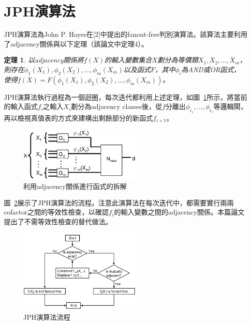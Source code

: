 \documentclass[
  12pt,
  paper=a4,
  ,captions=tableheading
]{scrartcl}
\newtheorem*{thm}{定理}
\begin{document}
\hypertarget{jphux6f14ux7b97ux6cd5}{%
\section{JPH演算法}\label{jphux6f14ux7b97ux6cd5}}

JPH演算法為John P.
Hayes在{[}2{]}中提出的fanout-free判別演算法。該算法主要利用了adjacency關係與以下定理（該論文中定理4）。

\begin{thm}

以adjacency關係將$f(X)$的輸入變數集合$X$劃分為等價類$X_1, X_2, \dots, X_m$，
則存在$\phi_1(X_1), \phi_2(X_2), \dots, \phi_m(X_m)$以及函式$F$，其中$\phi_i$為AND或OR函式，
使得$f(X) = F(\phi_1(X_1), \phi_2(X_2), \dots, \phi_m(X_m))$。

\end{thm}

JPH演算法執行過程為一個迴圈，每次迭代都利用上述定理，如圖~\ref{fig:decomp}所示，將當前的輸入函式\(f_i\)之輸入\(X_i\)劃分為adjacency
classes後，從\(f\)分離出\(\phi_{i_1}, \dots, \phi_{i_r}\)等邏輯閘，再以檢視真值表的方式來建構出剩餘部分的新函式\(f_{i+1}\)。

\begin{figure}
\hypertarget{fig:decomp}{%
\centering
\includegraphics[width=0.55\textwidth,height=\textheight]{./resources/adj-decomp.png}
\caption{利用adjacency關係進行函式的拆解}\label{fig:decomp}
}
\end{figure}

圖~\ref{fig:jph}展示了JPH演算法的流程。注意此演算法在每次迭代中，都需要實行兩兩cofactor之間的等效性檢查，以確認\(f_i\)的輸入變數之間的adjacency關係。本篇論文提出了不需等效性檢查的替代做法。

\begin{figure}
\hypertarget{fig:jph}{%
\centering
\includegraphics[width=0.55\textwidth,height=\textheight]{./resources/jph.png}
\caption{JPH演算法流程}\label{fig:jph}
}
\end{figure}
\end{document}
